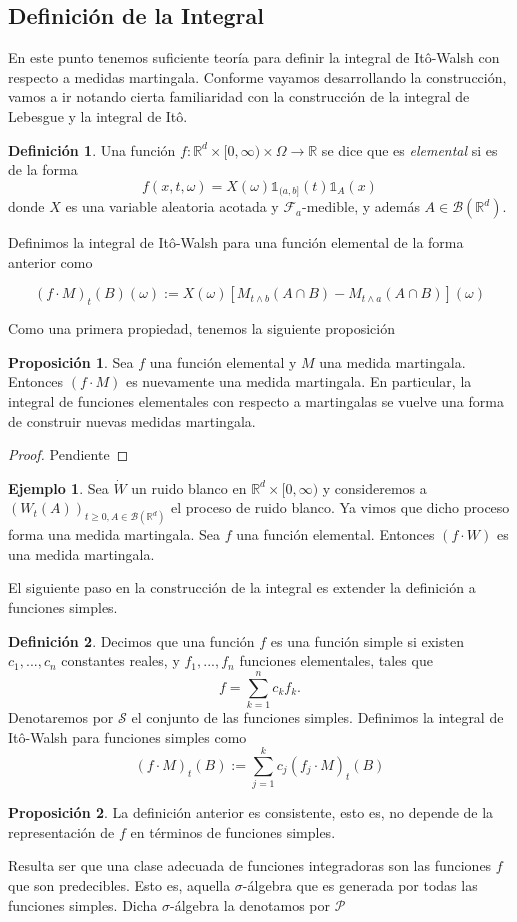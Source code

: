 \documentclass[letterpaper,twoside,12pt]{book}
\newcommand{\R}{\mathbb{R}}
\newcommand{\F}{\mathcal{F}}
\newcommand{\B}{\mathcal{B}}
\newcommand{\W}{\dot{W}}
\newcommand{\1}{\mathds{1}}
\renewcommand{\to}{\rightarrow}
\theoremstyle{definition}
\newtheorem{dfn}{Definición}
\theoremstyle{definition}
\theoremstyle{definition}
\theoremstyle{definition}
\newtheorem{prop}{Proposición}
\theoremstyle{definition}
\theoremstyle{definition}
\newtheorem{ejem}{Ejemplo}
\theoremstyle{definition}
\begin{document}
\subsection{Definición de la Integral}
En este punto tenemos suficiente teoría para definir la integral de Itô-Walsh con respecto a medidas martingala. Conforme vayamos desarrollando la construcción, vamos a ir notando cierta familiaridad con la construcción de la integral de Lebesgue y la integral de Itô.

\begin{dfn} 
 Una función $f:\R^{d}\times [0,\infty)\times \Omega\to \R$ se dice que es \textit{elemental} si es de la forma 
 \[
    f(x,t,\omega)=X(\omega)\1_{(a,b]}(t)\1_A(x) 
 \]
 donde $X$ es una variable aleatoria acotada y $\F_a$-medible, y además $A\in \B(\R^{d})$. 
 
 Definimos la integral de Itô-Walsh para una función elemental de la forma anterior como 

 \[
 (f\cdot M)_t(B)(\omega):= X(\omega)\left[M_{t\wedge b}(A\cap B)-M_{t\wedge a}(A\cap B)\right](\omega)  
 \]
\end{dfn}

Como una primera propiedad, tenemos la siguiente proposición
\begin{prop} 
 Sea $f$ una función elemental y $M$ una medida martingala. Entonces $(f\cdot M)$ es nuevamente una medida martingala. En particular, la integral de funciones elementales con respecto a martingalas se vuelve una forma de construir nuevas medidas martingala.
 \end{prop}
\begin{proof} 
  Pendiente 
 \end{proof}
\begin{ejem} 
 Sea $\W$ un ruido blanco en $\R^{d}\times[0,\infty)$ y consideremos a $(W_t(A))_{t\geq0,A\in \B(\R^d)}$ el proceso de ruido blanco. Ya vimos que dicho proceso forma una medida martingala. Sea $f$ una función elemental. Entonces $(f\cdot W)$ es una medida martingala.
 \end{ejem}
 
 El siguiente paso en la construcción de la integral es extender la definición a funciones simples. 

 \begin{dfn} 
    Decimos que una función $f$ es una función simple si existen $c_1,...,c_n$ constantes reales, y $f_1,...,f_n$ funciones elementales, tales que 
    \[
      f=\sum_{k=1}^{n}c_kf_k.  
    \] Denotaremos por $\mathscr{S}$ el conjunto de las funciones simples. Definimos la integral de Itô-Walsh para funciones simples como 
    \[
    (f\cdot M)_t(B):=\sum_{j=1}^{k}c_j(f_j\cdot M)_t(B)    
    \]
  \end{dfn}
  \begin{prop} 
   La definición anterior es consistente, esto es, no depende de la representación de $f$ en términos de funciones simples.
   \end{prop}
Resulta ser que una clase adecuada de funciones integradoras son las funciones $f$ que son predecibles. Esto es, aquella $\sigma$-álgebra que es generada por todas las funciones simples. Dicha $\sigma$-álgebra la denotamos por $\mathscr{P}$
\end{document}
